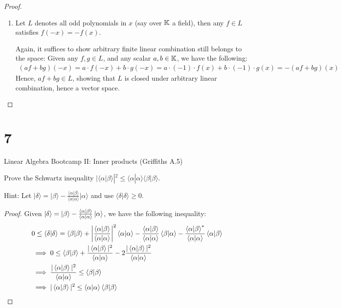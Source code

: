 \documentclass{article}
\begin{document}
\begin{proof}
\begin{enumerate}
        A convenient basis is $\{z^j\}_{j=0}^N$ (since a polynomial is $0$ iff all the coefficients of each $z^j$ is $0$, so $\{z^j\}$ if contained in the space, is linearly-independent; and, since $\{z^j\}_{j=0}^N \subset \mathcal{P}_N(\CC)$, together with the fact that all polynomials is a linear combination of these, the given list does form a basis).

        \vspace{0.5em}

        \item Let $L$ denotes all odd polynomials in $x$ (say over $\mathbb{K}$ a field), then any $f\in L$ satisfies $f(-x)=-f(x)$. 
        
        Again, it suffices to show arbitrary finite linear combination still belongs to the space: Given any $f,g\in L$, and any scalar $a,b\in\mathbb{K}$, we have the following:
        \begin{align}
            (af+bg)(-x) = a\cdot f(-x)+b\cdot g(-x) = a\cdot (-1)\cdot f(x)+b\cdot (-1)\cdot g(x)= -(af+bg)(x)
        \end{align}
        Hence, $af+bg\in L$, showing that $L$ is closed under arbitrary linear combination, hence a vector space.
    \end{enumerate}
\end{proof}

\newpage
\section*{7}
\begin{ques}
Linear Algebra Bootcamp II: Inner products (Griffiths A.5)

Prove the Schwartz inequality  
$|\langle \alpha | \beta \rangle|^2 \le \langle \alpha | \alpha \rangle \langle \beta | \beta \rangle$.

Hint: Let $|\delta\rangle = |\beta\rangle - \frac{\langle \alpha | \beta \rangle}{\langle \alpha | \alpha \rangle} |\alpha\rangle$ and use $\langle \delta | \delta \rangle \ge 0$.
\end{ques}
\begin{proof}
    Given $\ket{\delta} = \ket{\beta} - \frac{\braket{\alpha}{\beta}}{\braket{\alpha}{\alpha}}\ket{\alpha}$, we have the following inequality:
    \begin{align}
        &0\leq \braket{\delta}{\delta} = \braket{\beta}{\beta} + \left|\frac{\braket{\alpha}{\beta}}{\braket{\alpha}{\alpha}}\right|^2 \braket{\alpha}{\alpha} - \frac{\braket{\alpha}{\beta}}{\braket{\alpha}{\alpha}}\braket{\beta}{\alpha} - \frac{\braket{\alpha}{\beta}^*}{\braket{\alpha}{\alpha}}\braket{\alpha}{\beta}\\
        &\implies 0\leq \braket{\beta}{\beta}+\frac{|\braket{\alpha}{\beta}|^2}{\braket{\alpha}{\alpha}}-2\frac{|\braket{\alpha}{\beta}|^2}{\braket{\alpha}{\alpha}}\\
        &\implies \frac{|\braket{\alpha}{\beta}|^2}{\braket{\alpha}{\alpha}}\leq \braket{\beta}{\beta}\\
        &\implies |\braket{\alpha}{\beta}|^2 \leq \braket{\alpha} \braket{\beta}
    \end{align}
\end{proof}
\end{document}
